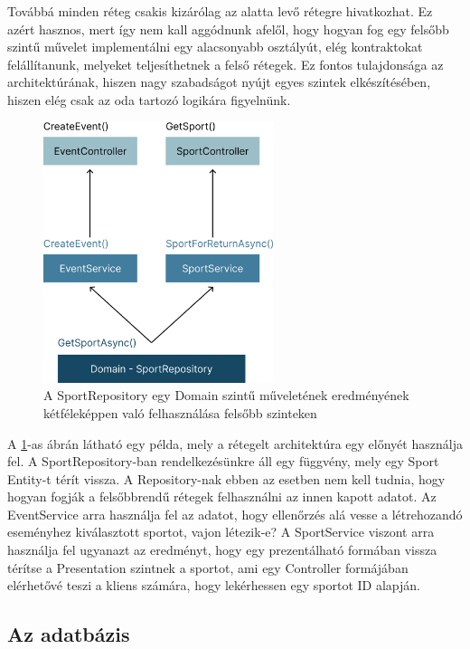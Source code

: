 Továbbá minden réteg csakis kizárólag az alatta levő rétegre hivatkozhat. Ez azért hasznos, mert így nem kall aggódnunk afelől, hogy hogyan fog egy felsőbb szintű művelet implementálni egy alacsonyabb osztályút, elég kontraktokat felállítanunk, melyeket teljesíthetnek a felső rétegek. Ez fontos tulajdonsága az architektúrának, hiszen nagy szabadságot nyújt egyes szintek elkészítésében, hiszen elég csak az oda tartozó logikára figyelnünk.

\begin{figure}[h]
    \centering
    \includegraphics[width=0.6\textwidth]{./images/get_sport_example.png}
    \caption{A SportRepository egy Domain szintű műveletének eredményének kétféleképpen való felhasználása felsőbb szinteken}
    \label{fig:sport_repo_usage_example}
\end{figure}

A \ref{fig:sport_repo_usage_example}-as ábrán látható egy példa, mely a rétegelt architektúra egy előnyét használja fel. A SportRepository-ban rendelkezésünkre áll egy függvény, mely egy Sport Entity-t térít vissza. A Repository-nak ebben az esetben nem kell tudnia, hogy hogyan fogják a felsőbbrendű rétegek felhasználni az innen kapott adatot. Az EventService arra használja fel az adatot, hogy ellenőrzés alá vesse a létrehozandó eseményhez kiválasztott sportot, vajon létezik-e? A SportService viszont arra használja fel ugyanazt az eredményt, hogy egy prezentálható formában vissza térítse a Presentation szintnek a sportot, ami egy Controller formájában elérhetővé teszi a kliens számára, hogy lekérhessen egy sportot ID alapján.

\subsection{Az adatbázis}

